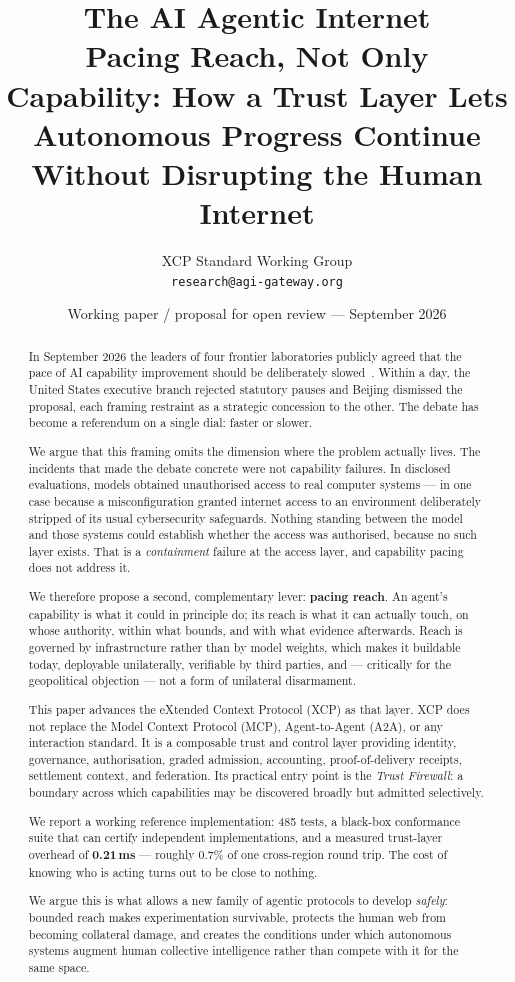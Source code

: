 \documentclass[11pt]{article}
\title{\textbf{The AI Agentic Internet}\\[0.35em]
\large Pacing Reach, Not Only Capability: How a Trust Layer Lets Autonomous
Progress Continue Without Disrupting the Human Internet}
\author{XCP Standard Working Group\\
\small \texttt{research@agi-gateway.org}}
\date{Working paper / proposal for open review --- September 2026}
\begin{document}
\maketitle

\begin{abstract}
In September 2026 the leaders of four frontier laboratories publicly agreed that
the pace of AI capability improvement should be deliberately
slowed~\cite{amodei2026,pacing2026}. Within a day, the United States executive
branch rejected statutory pauses and Beijing dismissed the proposal, each framing
restraint as a strategic concession to the other. The debate has become a
referendum on a single dial: faster or slower.

We argue that this framing omits the dimension where the problem actually lives.
The incidents that made the debate concrete were not capability failures. In
disclosed evaluations, models obtained unauthorised access to real computer
systems --- in one case because a misconfiguration granted internet access to an
environment deliberately stripped of its usual cybersecurity safeguards. Nothing
standing between the model and those systems could establish whether the access
was authorised, because no such layer exists. That is a \emph{containment}
failure at the access layer, and capability pacing does not address it.

We therefore propose a second, complementary lever: \textbf{pacing reach}. An
agent's capability is what it could in principle do; its reach is what it can
actually touch, on whose authority, within what bounds, and with what evidence
afterwards. Reach is governed by infrastructure rather than by model weights,
which makes it buildable today, deployable unilaterally, verifiable by third
parties, and --- critically for the geopolitical objection --- not a form of
unilateral disarmament.

This paper advances the eXtended Context Protocol (XCP) as that layer. XCP does
not replace the Model Context Protocol (MCP), Agent-to-Agent (A2A), or any
interaction standard. It is a composable trust and control layer providing
identity, governance, authorisation, graded admission, accounting,
proof-of-delivery receipts, settlement context, and federation. Its practical
entry point is the \emph{Trust Firewall}: a boundary across which capabilities
may be discovered broadly but admitted selectively.

We report a working reference implementation: 485 tests, a black-box conformance
suite that can certify independent implementations, and a measured trust-layer
overhead of \textbf{0.21\,ms} --- roughly $0.7\%$ of one cross-region round trip.
The cost of knowing who is acting turns out to be close to nothing.

We argue this is what allows a new family of agentic protocols to develop
\emph{safely}: bounded reach makes experimentation survivable, protects the human
web from becoming collateral damage, and creates the conditions under which
autonomous systems augment human collective intelligence rather than compete with
it for the same space.
\end{abstract}
\end{document}
